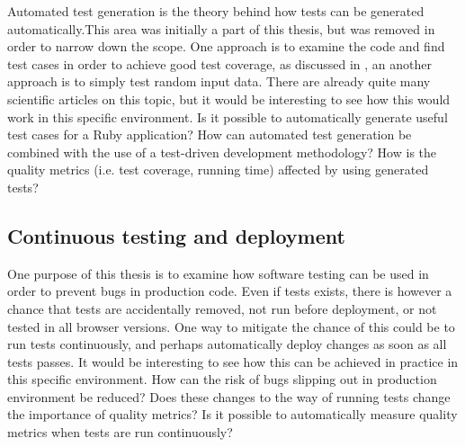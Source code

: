 Automated test generation is the theory behind how tests can be
generated automatically.This area was initially a part of this thesis,
but was removed in order to narrow down the scope. One approach is to
examine the code and find test cases in order to achieve good test
coverage, as discussed in , an another
approach is to simply test random input data. There are already quite
many scientific articles on this topic, but it would be interesting to
see how this would work in this specific environment. Is it possible to
automatically generate useful test cases for a Ruby application? How can
automated test generation be combined with the use of a test-driven
development methodology? How is the quality metrics (i.e. test coverage,
running time) affected by using generated tests?\\


\subsection{Continuous testing and deployment}

One purpose of this thesis is to examine how software testing can be
used in order to prevent bugs in production code. Even if tests exists,
there is however a chance that tests are accidentally removed, not run
before deployment, or not tested in all browser versions. One way to
mitigate the chance of this could be to run tests continuously, and
perhaps automatically deploy changes as soon as all tests passes. It
would be interesting to see how this can be achieved in practice in this
specific environment. How can the risk of bugs slipping out in
production environment be reduced? Does these changes to the way of
running tests change the importance of quality metrics? Is it possible
to automatically measure quality metrics when tests are run
continuously?\\

